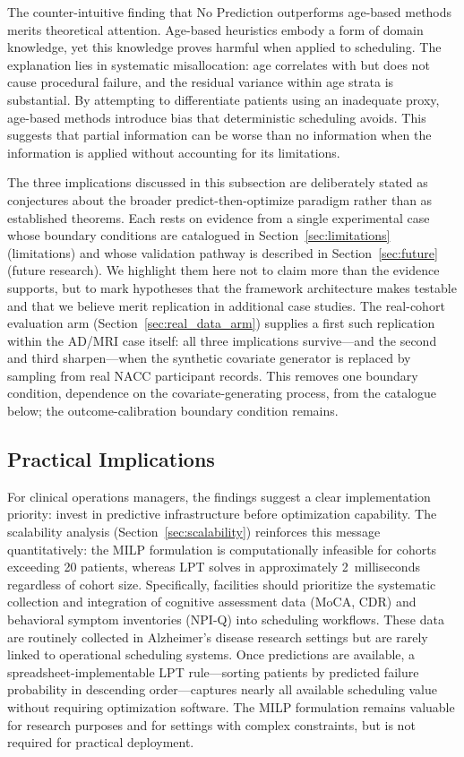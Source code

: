 \documentclass[11pt,a4paper]{article}
\newcommand{\rev}[1]{{\color{red}#1}}
\begin{document}
The counter-intuitive finding that No Prediction outperforms age-based methods merits theoretical attention. Age-based heuristics embody a form of domain knowledge, yet this knowledge proves harmful when applied to scheduling. The explanation lies in systematic misallocation: age correlates with but does not cause procedural failure, and the residual variance within age strata is substantial. By attempting to differentiate patients using an inadequate proxy, age-based methods introduce bias that deterministic scheduling avoids. This suggests that partial information can be worse than no information when the information is applied without accounting for its limitations.

The three implications discussed in this subsection are deliberately stated as conjectures about the broader predict-then-optimize paradigm rather than as established theorems. Each rests on evidence from a single experimental case whose boundary conditions are catalogued in Section~\ref{sec:limitations} (limitations) and whose validation pathway is described in Section~\ref{sec:future} (future research). We highlight them here not to claim more than the evidence supports, but to mark hypotheses that the framework architecture makes testable and that we believe merit replication in additional case studies. \rev{The real-cohort evaluation arm (Section~\ref{sec:real_data_arm}) supplies a first such replication within the AD/MRI case itself: all three implications survive---and the second and third sharpen---when the synthetic covariate generator is replaced by sampling from real NACC participant records. This removes one boundary condition, dependence on the covariate-generating process, from the catalogue below; the outcome-calibration boundary condition remains.}

\subsection{Practical Implications}

For clinical operations managers, the findings suggest a clear implementation priority: invest in predictive infrastructure before optimization capability. The scalability analysis (Section~\ref{sec:scalability}) reinforces this message quantitatively: the MILP formulation is computationally infeasible for cohorts exceeding 20 patients, whereas LPT solves in approximately 2~milliseconds regardless of cohort size. Specifically, facilities should prioritize the systematic collection and integration of cognitive assessment data (MoCA, CDR) and behavioral symptom inventories (NPI-Q) into scheduling workflows. These data are routinely collected in Alzheimer's disease research settings but are rarely linked to operational scheduling systems. Once predictions are available, a spreadsheet-implementable LPT rule---sorting patients by predicted failure probability in descending order---captures nearly all available scheduling value without requiring optimization software. The MILP formulation remains valuable for research purposes and for settings with complex constraints, but is not required for practical deployment.
\end{document}
